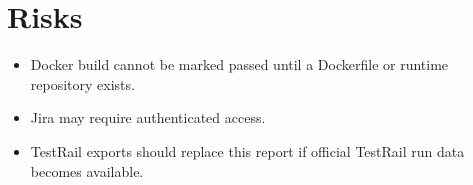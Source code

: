 \documentclass[12pt]{article}
\begin{document}
\section{Risks}
\begin{itemize}[leftmargin=*]
  \item Docker build cannot be marked passed until a Dockerfile or runtime repository exists.
  \item Jira may require authenticated access.
  \item TestRail exports should replace this report if official TestRail run data becomes available.
\end{itemize}
\end{document}
